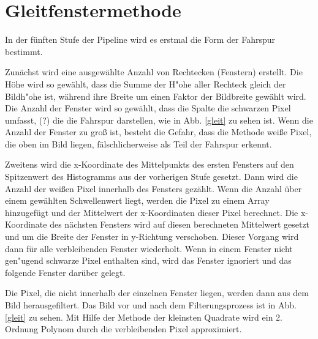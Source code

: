\documentclass[arbeit=studie,oneside,BCOR=12mm]{ArbeitRST}
\begin{document}
\section{Gleitfenstermethode}

In der fünften Stufe der Pipeline wird es erstmal die Form der Fahrspur bestimmt.

Zunächst wird eine ausgewählte Anzahl von Rechtecken (Fenstern) erstellt.  Die Höhe
wird so gewählt, dass die Summe der H"ohe aller Rechteck gleich der Bildh"ohe ist,
während ihre Breite um einen Faktor der Bildbreite gewählt wird. Die Anzahl der
Fenster wird so gewählt, dass die Spalte die schwarzen Pixel umfasst, (?) die die
Fahrspur darstellen, wie in Abb. \ref{gleit} zu sehen ist. Wenn die Anzahl der
Fenster zu groß ist, besteht die Gefahr, dass die Methode weiße Pixel, die oben 
im Bild liegen, fälschlicherweise als Teil der Fahrspur erkennt. 

Zweitens wird die x-Koordinate des Mittelpunkts des ersten Fensters auf den
Spitzenwert des Histogramms aus der vorherigen Stufe gesetzt. Dann wird die
Anzahl der weißen Pixel innerhalb des Fensters gezählt. Wenn die Anzahl über
einem gewählten Schwellenwert liegt, werden die Pixel zu einem Array
hinzugefügt und der Mittelwert der x-Koordinaten dieser Pixel
berechnet. Die x-Koordinate des nächsten Fensters wird auf diesen
berechneten Mittelwert gesetzt und um die Breite der Fenster in y-Richtung verschoben. Dieser
Vorgang wird dann für alle verbleibenden Fenster wiederholt. Wenn in einem
Fenster nicht gen"ugend schwarze Pixel enthalten sind, wird das Fenster ignoriert und das folgende
Fenster darüber gelegt.  

Die Pixel, die nicht innerhalb der einzelnen Fenster liegen, werden dann aus
dem Bild herausgefiltert. Das Bild vor und nach dem Filterungsprozess ist in
Abb. \ref{gleit} zu sehen. Mit Hilfe der Methode der kleinsten Quadrate wird ein
2. Ordnung Polynom durch die verbleibenden Pixel approximiert.
\end{document}
